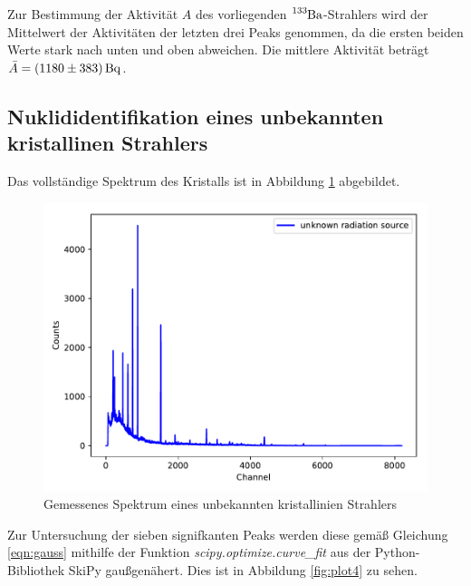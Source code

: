Zur Bestimmung der Aktivität $A$ des vorliegenden $\ce{^{133}Ba}$-Strahlers wird der Mittelwert der Aktivitäten der letzten drei
Peaks genommen, da die ersten beiden Werte stark nach unten und oben abweichen.
Die mittlere Aktivität beträgt $\bar{A} = \SI{1180 +- 383}{\becquerel}$.


\subsection{Nuklididentifikation %
            eines unbekannten kristallinen Strahlers}

Das vollständige Spektrum des Kristalls ist in Abbildung \ref{fig:plot41} abgebildet.

\begin{figure}
  \centering
  \includegraphics[scale=0.7]{content/plot41.pdf}
  \caption{Gemessenes Spektrum eines unbekannten kristallinien Strahlers}
  \label{fig:plot41}
\end{figure}

Zur Untersuchung der sieben signifkanten Peaks werden diese gemäß Gleichung \eqref{eqn:gauss} 
mithilfe der Funktion \textit{scipy.optimize.curve\_fit} aus der Python-Bibliothek SkiPy gaußgenähert.
Dies ist in Abbildung \ref{fig:plot4} zu sehen.

